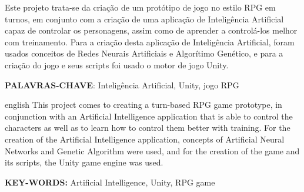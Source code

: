 \documentclass[
	12pt,					%
	openright,				%
	oneside,				%
	a4paper,				%
	bibjustif,				%
	chapter=TITLE,			%
	english,				%
	brazil,					%
	]{abntex2}
\begin{document}
\newpage %
\thispagestyle{empty} %
\begin{resumo}
	\SingleSpacing
	Este projeto trata-se da criação de um protótipo de jogo no estilo RPG em turnos,
	em conjunto com a criação de uma aplicação de Inteligência Artificial capaz de controlar os personagens,
	assim como de aprender a controlá-los melhor com treinamento.
	Para a criação desta aplicação de Inteligência Artificial,
	foram usados conceitos de Redes Neurais Artificiais e Algorítimo Genético,
	e para a criação do jogo e seus scripts
	foi usado o motor de jogo Unity.
 	
 	\vspace{\onelineskip}
	\textbf{PALAVRAS-CHAVE}: Inteligência Artificial, Unity, jogo RPG
\end{resumo}


\newpage %
\thispagestyle{empty} %
\begin{resumo}[Abstract]
	\begin{otherlanguage*}{english}
		\SingleSpacing
		This project comes to creating a turn-based RPG game prototype,
		in conjunction with an Artificial Intelligence application that is able to control the characters
		as well as to learn how to control them better with training.
		For the creation of the Artificial Intelligence application,
		concepts of Artificial Neural Networks and Genetic Algorithm were used,
		and for the creation of the game and its scripts,
		the Unity game engine was used.
		
		\vspace{\onelineskip}
		\textbf{KEY-WORDS:} Artificial Intelligence, Unity, RPG game
	\end{otherlanguage*}
\end{resumo}


\newpage %
\renewcommand*\listfigurename{LISTA DE FIGURAS}
\pdfbookmark[0]{\listfigurename}{lof}
\listoffigures*
\cleardoublepage

\newpage %
\thispagestyle{empty} %
\listoftables*
\cleardoublepage
\end{document}
